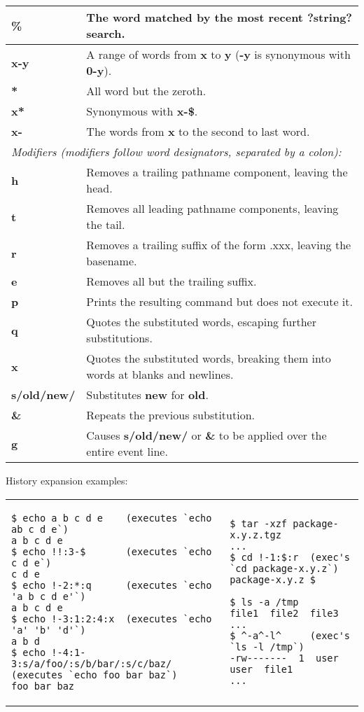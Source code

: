 \documentclass{article}
\begin{document}
\begin{tabular}{|p{3.5cm}|p{14cm}|}
\hline
\textbf{\%} & The word matched by the most recent ?string? search. \\
\hline
\textbf{x-y} & A range of words from \textbf{x} to \textbf{y} (\textbf{-y} is synonymous with \textbf{0-y}). \\
\hline
\textbf{*} & All word but the zeroth. \\
\hline
\textbf{x*} & Synonymous with \textbf{x-\$}. \\
\hline
\textbf{x-} & The words from \textbf{x} to the second to last word. \\
\hline
\multicolumn{2}{|l|}{\small\it{Modifiers (modifiers follow word designators, separated by a colon):}} \\
\hline
\textbf{h} & Removes a trailing pathname component, leaving the head. \\
\hline
\textbf{t} & Removes all leading pathname components, leaving the tail. \\
\hline
\textbf{r} & Removes a trailing suffix of the form .xxx, leaving the basename. \\
\hline
\textbf{e} & Removes all but the trailing suffix. \\
\hline
\textbf{p} & Prints the resulting command but does not execute it. \\
\hline
\textbf{q} & Quotes the substituted words, escaping further substitutions. \\
\hline
\textbf{x} & Quotes the substituted words, breaking them into words at blanks and newlines. \\
\hline
\textbf{s/old/new/} & Substitutes \textbf{new} for \textbf{old}. \\
\hline
\textbf{\&} & Repeats the previous substitution. \\
\hline
\textbf{g} & Causes \textbf{s/old/new/} or \textbf{\&} to be applied over the entire event line. \\
\hline
\end{tabular}

\vspace{0.4in}
History expansion examples:

\begin{tabular}{p{10cm}|p{7.5cm}}
\begin{verbatim}
$ echo a b c d e    (executes `echo ab c d e`)
a b c d e
$ echo !!:3-$       (executes `echo c d e`)
c d e
$ echo !-2:*:q      (executes `echo 'a b c d e'`)
a b c d e
$ echo !-3:1:2:4:x  (executes `echo 'a' 'b' 'd'`)
a b d
$ echo !-4:1-3:s/a/foo/:s/b/bar/:s/c/baz/
(executes `echo foo bar baz`)
foo bar baz
\end{verbatim}
& 
\begin{verbatim}
$ tar -xzf package-x.y.z.tgz
...
$ cd !-1:$:r  (exec's `cd package-x.y.z`)
package-x.y.z $

$ ls -a /tmp
file1  file2  file3 ...
$ ^-a^-l^     (exec's `ls -l /tmp`)
-rw-------  1  user  user  file1
...
\end{verbatim}
\end{tabular}
\end{document}
